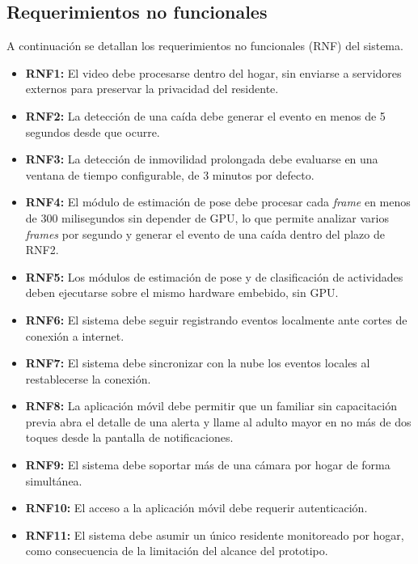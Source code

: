 \subsection{Requerimientos no funcionales}

A continuación se detallan los requerimientos no funcionales (RNF) del sistema.

\begin{itemize}
    \item \textbf{RNF1:} El video debe procesarse dentro del hogar, sin enviarse a servidores externos para preservar la privacidad del residente.
    \item \textbf{RNF2:} La detección de una caída debe generar el evento en menos de 5 segundos desde que ocurre.
    \item \textbf{RNF3:} La detección de inmovilidad prolongada debe evaluarse en una ventana de tiempo configurable, de 3 minutos por defecto.
    \item \textbf{RNF4:} El módulo de estimación de pose debe procesar cada \textit{frame} en menos de 300 milisegundos sin depender de GPU, lo que permite analizar varios \textit{frames} por segundo y generar el evento de una caída dentro del plazo de RNF2.
    \item \textbf{RNF5:} Los módulos de estimación de pose y de clasificación de actividades deben ejecutarse sobre el mismo hardware embebido, sin GPU.
    \item \textbf{RNF6:} El sistema debe seguir registrando eventos localmente ante cortes de conexión a internet.
    \item \textbf{RNF7:} El sistema debe sincronizar con la nube los eventos locales al restablecerse la conexión.
    \item \textbf{RNF8:} La aplicación móvil debe permitir que un familiar sin capacitación previa abra el detalle de una alerta y llame al adulto mayor en no más de dos toques desde la pantalla de notificaciones.
    \item \textbf{RNF9:} El sistema debe soportar más de una cámara por hogar de forma simultánea.
    \item \textbf{RNF10:} El acceso a la aplicación móvil debe requerir autenticación.
    \item \textbf{RNF11:} El sistema debe asumir un único residente monitoreado por hogar, como consecuencia de la limitación del alcance del prototipo.
\end{itemize}
\vspace*{2pt}


